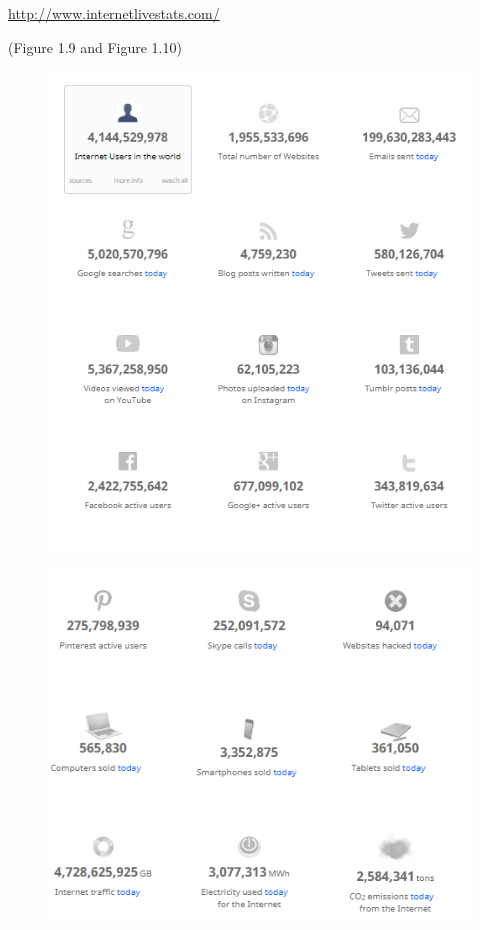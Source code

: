 \documentclass[]{book}
\begin{document}
\url{http://www.internetlivestats.com/}

(Figure 1.9 and Figure 1.10)

\begin{figure}
\centering
\includegraphics{9.PNG}
\caption{}
\end{figure}

\begin{figure}
\centering
\includegraphics{10.PNG}
\caption{}
\end{figure}
\end{document}
